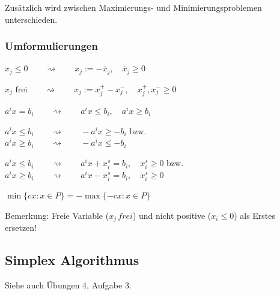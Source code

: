     Zusätzlich wird zwischen Maximierungs- und Minimierungsproblemen unterschieden.
    
  \subsubsection{Umformulierungen }
    \begin{aufzaehlung}
      \item $x_j \leq 0 \qquad \rightsquigarrow \qquad x_j := -\bar{x}_j, \quad \bar{x}_j \geq 0$
      \item $x_j \text{ frei} \qquad \rightsquigarrow \qquad x_j := x_j^+ - x_j^-, \quad x_j^+, x_j^- \geq 0$
      \item $a^i x = b_i \qquad \rightsquigarrow \qquad a^i x \leq b_i, \quad a^i x \geq b_i$
      \item $a^i x \leq b_i \qquad \rightsquigarrow \qquad -a^i x \geq -b_i$ bzw.\\
            $a^i x \geq b_i \qquad \rightsquigarrow \qquad -a^i x \leq -b_i$
      \item $a^i x \leq b_i \qquad \rightsquigarrow \qquad a^i x + x_i^s = b_i, \quad x_i^s \geq 0$ bzw.\\
            $a^i x \geq b_i \qquad \rightsquigarrow \qquad a^i x - x_i^s = b_i, \quad x_i^s \geq 0$ \\
      \item $\min \{cx: x \in P\} = - \max \{-cx: x \in P\}$
    \end{aufzaehlung}
  
  	Bemerkung: Freie Variable ($x_j \, frei$) und nicht positive ($x_i \leq 0$) als Erstes ersetzen!
  	


\subsection{Simplex Algorithmus }
  Siehe auch Übungen 4, Aufgabe 3.
  
